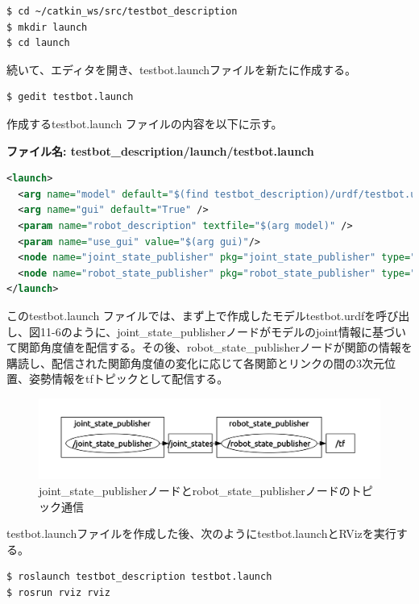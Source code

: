 \begin{lstlisting}[language=ROS]
$ cd ~/catkin_ws/src/testbot_description
$ mkdir launch
$ cd launch
\end{lstlisting}

続いて、エディタを開き、testbot.launchファイルを新たに作成する。

\begin{lstlisting}[language=ROS]
$ gedit testbot.launch
\end{lstlisting}

作成するtestbot.launch ファイルの内容を以下に示す。

\textbf{ファイル名: testbot\_description/launch/testbot.launch}

\begin{lstlisting}[language=XML]
<launch>
  <arg name="model" default="$(find testbot_description)/urdf/testbot.urdf" />
  <arg name="gui" default="True" />
  <param name="robot_description" textfile="$(arg model)" />
  <param name="use_gui" value="$(arg gui)"/>
  <node name="joint_state_publisher" pkg="joint_state_publisher" type="joint_state_publisher" />
  <node name="robot_state_publisher" pkg="robot_state_publisher" type="state_publisher" />
</launch>
\end{lstlisting}

このtestbot.launch ファイルでは、まず上で作成したモデルtestbot.urdfを呼び出し、図11-6のように、joint\_state\_publisherノードがモデルのjoint情報に基づいて関節角度値を配信する。その後、robot\_state\_publisherノードが関節の情報を購読し、配信された関節角度値の変化に応じて各関節とリンクの間の3次元位置、姿勢情報をtfトピックとして配信する。

\begin{figure}[htp]
  \centering
  \includegraphics[width=12cm]{pictures/chapter11/pic_11_06.png}
  \caption{joint\_state\_publisherノードとrobot\_state\_publisherノードのトピック通信}
\end{figure}

testbot.launchファイルを作成した後、次のようにtestbot.launchとRVizを実行する。

\begin{lstlisting}[language=ROS]
$ roslaunch testbot_description testbot.launch
$ rosrun rviz rviz
\end{lstlisting}

